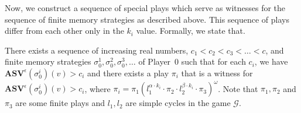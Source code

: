 Now, we construct a sequence of special plays which serve as witnesses for the sequence of finite memory strategies as described above. This sequence of plays differ from each other only in the $k_i$ value. Formally, we state that.
\begin{proposition}
    \label{PropConvergenceStrategies}
    There exists a sequence of increasing real numbers, $c_1 < c_2 < c_3 < \dotsc < c$, and finite memory strategies $\sigma_0^1, \sigma_0^2, \sigma_0^3, \dotsc$ of Player~0 such that for each $c_i$, we have $\mathbf{ASV}^{\epsilon} (\sigma_0^i)(v) > c_i$ and there exists a play $\pi_i$ that is a witness for $ \mathbf{ASV}^{\epsilon}(\sigma_0^i)(v) > c_i$, where $\pi_i= \pi_{1}(l^{\alpha \cdot k_i}_{1} \cdot \pi_{2} \cdot l^{\beta \cdot k_i}_{2} \cdot \pi_{3})^{\omega}$. Note that $\pi_1, \pi_2$ and $\pi_3$ are some finite plays and $l_1, l_2$ are simple cycles in the game $\mathcal{G}$.
\end{proposition}
